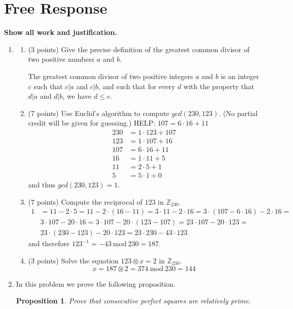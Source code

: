 \documentclass[12pt]{article}
\newtheorem*{proposition}{Proposition}
\begin{document}
\section*{Free Response}

\textbf{Show all work and justification.} 

\begin{enumerate}
\item 
\begin{enumerate}
\item (3 points) Give the precise definition of the greatest common divisor of two positive numbers $a$ and $b$.\vspace{1cm}

The greatest common divisor of two positive integers $a$ and $b$ is an integer $c$ such that $c|a$ and $c|b$, and such that for every $d$ with the property that $d|a$ and $d|b$, we have $d\leq c$.

\item (7 points) Use Euclid's algorithm to compute $gcd(230,123)$. (No partial credit will be given for guessing.)
HELP: $107=6\cdot 16+11$
\begin{align*}
230 &= 1\cdot 123 + 107\\
123&= 1\cdot 107 + 16\\
107&= 6\cdot 16 + 11\\
16&= 1\cdot 11 + 5\\
11&= 2\cdot 5 +1\\
5&= 5\cdot 1 + 0
\end{align*}
and thus $gcd(230,123)=1$.

\vspace{0.5cm}
\item (7 points) Compute the reciprocal of $123$ in $\mathbb{Z}_{230}$. \vspace{0.5cm}
\begin{align*}
1 &= 11-2\cdot 5 = 11-2\cdot(16-11)=3\cdot 11 - 2\cdot 16=3\cdot(107-6\cdot 16)-2\cdot 16=\\
&3\cdot 107-20\cdot 16=3\cdot 107-20\cdot(123-107)=23\cdot 107-20\cdot 123=\\
&23\cdot(230-123)-20\cdot 123=23\cdot 230-43\cdot 123
\end{align*}
and therefore $123^{-1}=-43\mathrm{~mod~} 230 = 187$.
\item (3 points) Solve the equation $123\otimes x=2$ in $\mathbb{Z}_{230}$.
\[
x= 187\otimes 2 = 374\mathrm{~mod~}230=144
\]
\end{enumerate}\newpage
\newpage
\item In this problem we prove the following proposition.
\begin{proposition}
 Prove that consecutive perfect squares are relatively prime.
\end{proposition}


\end{enumerate}
\end{document}
